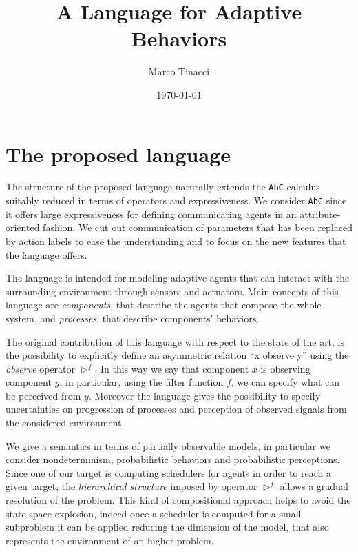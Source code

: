 \documentclass{article}
\title{A Language for Adaptive Behaviors}
\author{Marco Tinacci}
\date{\today}
\theoremstyle{remark}
\begin{document}
\maketitle


\section{The proposed language} %
\label{sec:introduction}

The structure of the proposed language naturally extends the \texttt{AbC} calculus
suitably reduced in terms of operators and expressiveness. We consider \texttt{AbC} since it offers large expressiveness for defining communicating agents in an attribute-oriented fashion.
We cut out communication of parameters that has been replaced by action labels to ease the understanding and to focus on the new features that the language offers.

The language is intended for modeling adaptive agents that can interact with the surrounding environment through sensors and actuators. Main concepts of this language are \emph{components}, that describe the agents that compose the whole system, and \emph{processes}, that describe components' behaviors.

The original contribution of this language with respect to the state of the art, is the possibility to explicitly define an asymmetric relation ``x observe y'' using the \emph{observe} operator $\triangleright^f$. In this way we say that component $x$ is observing component $y$, in particular, using the filter function $f$, we can specify what can be perceived from $y$. Moreover the language gives the possibility to specify uncertainties on progression of processes and perception of observed signals from the considered environment.

We give a semantics in terms of partially observable models, in particular we consider nondeterminism, probabilistic behaviors and probabilistic perceptions. Since one of our target is computing schedulers for agents in order to reach a given target, the \emph{hierarchical structure} imposed by operator $\triangleright^f$ allows a gradual resolution of the problem. This kind of compositional approach helps to avoid the state space explosion, indeed once a scheduler is computed for a small subproblem it can be applied reducing the dimension of the model, that also represents the environment of an higher problem.
\end{document}
